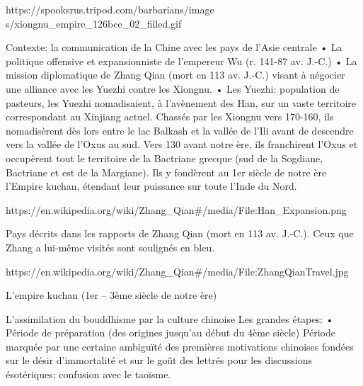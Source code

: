 https://spooksrus.tripod.com/barbarians/image s/xiongnu_empire_126bce_02_filled.gif
 
Contexte: la communication de la Chine avec les pays de l’Asie centrale
•	La politique offensive et expansionniste de l’empereur Wu (r. 141-87 av. J.-C.)
•	La mission diplomatique de Zhang Qian (mort en 113 av. J.-C.) visant à négocier une alliance avec les Yuezhi contre les Xiongnu.
•	Les Yuezhi: population de pasteurs, les Yuezhi nomadisaient, à l’avènement des Han, sur un vaste territoire correspondant au Xinjiang actuel. Chassés par les Xiongnu vers 170-160, ils nomadisèrent dès lors entre le lac Balkash et la vallée de l’Ili avant de descendre vers la vallée de l’Oxus au sud. Vers 130 avant notre ère, ils franchirent l’Oxus et occupèrent tout le territoire de la Bactriane grecque (sud de la Sogdiane, Bactriane et est de la Margiane). Ils y fondèrent au 1er siècle de notre ère l’Empire kuchan, étendant leur puissance sur toute l’Inde du Nord.
 










































https://en.wikipedia.org/wiki/Zhang_Qian#/media/File:Han_Expansion.png
 
Pays décrits dans les rapports de Zhang Qian (mort en 113 av. J.-C.).
Ceux que Zhang a lui-même visités sont soulignés en bleu.


https://en.wikipedia.org/wiki/Zhang_Qian#/media/File:ZhangQianTravel.jpg
 

 


L’empire kuchan (1er – 3ème siècle de notre ère)
 
L’assimilation du bouddhisme par la culture chinoise
Les grandes étapes:
•	Période de préparation (des origines jusqu’au début du 4ème siècle)
Période marquée par une certaine ambiguïté des premières motivations chinoises fondées sur le désir d’immortalité et sur le goût des lettrés pour les discussions ésotériques; confusion avec le taoïsme.

